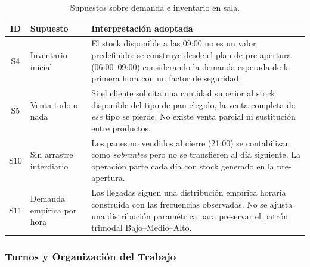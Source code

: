 \documentclass[10pt, a4paper]{article}
\begin{document}
\begin{table}[H]
\centering
\caption{Supuestos sobre demanda e inventario en sala.}
\label{tab:supuestos_demanda}
\renewcommand{\arraystretch}{1.30}
\begin{tabularx}{\textwidth}{c >{\raggedright\arraybackslash}p{3.5cm} X}
\toprule
\rowcolor{azulClaro}
\textbf{ID} & \textbf{Supuesto} & \textbf{Interpretaci\'on adoptada} \\
\midrule
S4  & Inventario inicial
    & El stock disponible a las 09:00 no es un valor predefinido: se
      construye desde el plan de pre-apertura (06:00--09:00) considerando la
      demanda esperada de la primera hora con un factor de seguridad. \\
\rowcolor{grisClaro}
S5  & Venta todo-o-nada
    & Si el cliente solicita una cantidad superior al stock disponible del
      tipo de pan elegido, la venta completa de \emph{ese} tipo se pierde.
      No existe venta parcial ni sustituci\'on entre productos. \\
S10 & Sin arrastre interdiario
    & Los panes no vendidos al cierre (21:00) se contabilizan como
      \emph{sobrantes} pero no se transfieren al d\'ia siguiente. La
      operaci\'on parte cada d\'ia con stock generado en la pre-apertura. \\
\rowcolor{grisClaro}
S11 & Demanda emp\'irica por hora
    & Las llegadas siguen una distribuci\'on emp\'irica horaria construida
      con las frecuencias observadas. No se ajusta una distribuci\'on
      param\'etrica para preservar el patr\'on trimodal Bajo--Medio--Alto. \\
\bottomrule
\end{tabularx}
\end{table}

\subsubsection{Turnos y Organizaci\'on del Trabajo}
\end{document}
